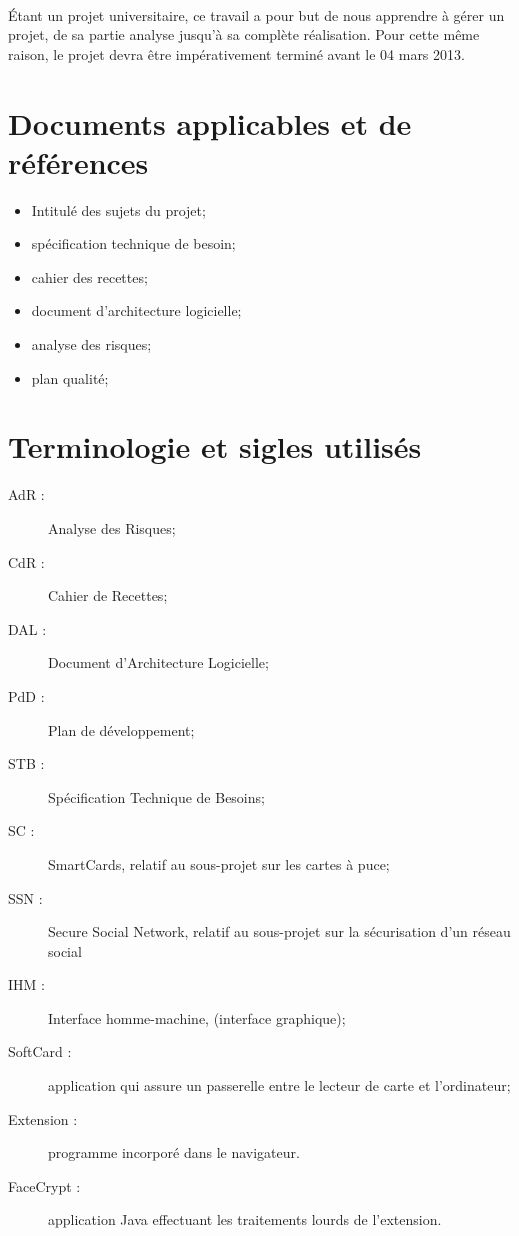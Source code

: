 \documentclass[a4paper,11pt,french]{article}
\begin{document}
\paragraph{}
Étant un projet universitaire, ce travail a pour but de nous apprendre
à gérer un projet, de sa partie analyse jusqu'à sa complète réalisation. Pour
cette même raison, le projet devra être impérativement terminé avant le 04 
mars 2013.

\section{Documents applicables et de références}
\begin{itemize}
 \item Intitulé des sujets du projet;
 \item spécification technique de besoin;
 \item cahier des recettes;
 \item document d'architecture logicielle;
 \item analyse des risques;
 \item plan qualité;
\end{itemize}

\section{Terminologie et sigles utilisés}
\begin{description}
	\item[AdR :] Analyse des Risques;
	\item[CdR :] Cahier de Recettes;
	\item[DAL :] Document d'Architecture Logicielle;
	\item[PdD :] Plan de développement;
	\item[STB :] Spécification Technique de Besoins;
	\item[SC :] SmartCards, relatif au sous-projet sur
    les cartes à puce;
	\item[SSN :] Secure Social Network, relatif au sous-projet
    sur la sécurisation d'un réseau social
	\item[IHM :] Interface homme-machine, (interface graphique);
	\item[SoftCard :] application qui assure un passerelle entre
    le lecteur de carte et l'ordinateur;
    \item[Extension :] programme incorporé dans le navigateur.
    \item[FaceCrypt :] application Java effectuant les traitements lourds 
    de l'extension.
\end{description}
\end{document}
